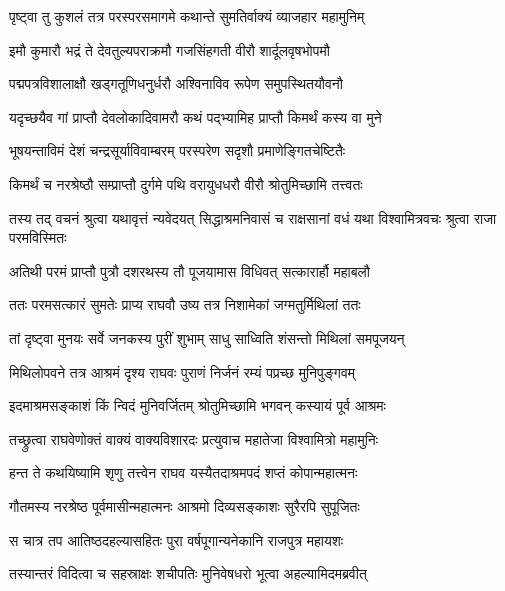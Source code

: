 
\twolineshloka
{पृष्ट्वा तु कुशलं तत्र परस्परसमागमे}
{कथान्ते सुमतिर्वाक्यं व्याजहार महामुनिम्} %

\twolineshloka
{इमौ कुमारौ भद्रं ते देवतुल्यपराक्रमौ}
{गजसिंहगती वीरौ शार्दूलवृषभोपमौ} %

\twolineshloka
{पद्मपत्रविशालाक्षौ खड्गतूणिधनुर्धरौ}
{अश्विनाविव रूपेण समुपस्थितयौवनौ} %

\twolineshloka
{यदृच्छयैव गां प्राप्तौ देवलोकादिवामरौ}
{कथं पद्भ्यामिह प्राप्तौ किमर्थं कस्य वा मुने} %

\twolineshloka
{भूषयन्ताविमं देशं चन्द्रसूर्याविवाम्बरम्}
{परस्परेण सदृशौ प्रमाणेङ्गितचेष्टितैः} %

\twolineshloka
{किमर्थं च नरश्रेष्ठौ सम्प्राप्तौ दुर्गमे पथि}
{वरायुधधरौ वीरौ श्रोतुमिच्छामि तत्त्वतः} %

\threelineshloka
{तस्य तद् वचनं श्रुत्वा यथावृत्तं न्यवेदयत्}
{सिद्धाश्रमनिवासं च राक्षसानां वधं यथा}
{विश्वामित्रवचः श्रुत्वा राजा परमविस्मितः} %

\twolineshloka
{अतिथी परमं प्राप्तौ पुत्रौ दशरथस्य तौ}
{पूजयामास विधिवत् सत्कारार्हौ महाबलौ} %

\twolineshloka
{ततः परमसत्कारं सुमतेः प्राप्य राघवौ}
{उष्य तत्र निशामेकां जग्मतुर्मिथिलां ततः} %

\twolineshloka
{तां दृष्ट्वा मुनयः सर्वे जनकस्य पुरीं शुभाम्}
{साधु साध्विति शंसन्तो मिथिलां समपूजयन्} %

\twolineshloka
{मिथिलोपवने तत्र आश्रमं दृश्य राघवः}
{पुराणं निर्जनं रम्यं पप्रच्छ मुनिपुङ्गवम्} %

\twolineshloka
{इदमाश्रमसङ्काशं किं न्विदं मुनिवर्जितम्}
{श्रोतुमिच्छामि भगवन् कस्यायं पूर्व आश्रमः} %

\twolineshloka
{तच्छ्रुत्वा राघवेणोक्तं वाक्यं वाक्यविशारदः}
{प्रत्युवाच महातेजा विश्वामित्रो महामुनिः} %

\twolineshloka
{हन्त ते कथयिष्यामि शृणु तत्त्वेन राघव}
{यस्यैतदाश्रमपदं शप्तं कोपान्महात्मनः} %

\twolineshloka
{गौतमस्य नरश्रेष्ठ पूर्वमासीन्महात्मनः}
{आश्रमो दिव्यसङ्काशः सुरैरपि सुपूजितः} %

\twolineshloka
{स चात्र तप आतिष्ठदहल्यासहितः पुरा}
{वर्षपूगान्यनेकानि राजपुत्र महायशः} %

\twolineshloka
{तस्यान्तरं विदित्वा च सहस्राक्षः शचीपतिः}
{मुनिवेषधरो भूत्वा अहल्यामिदमब्रवीत्} %

